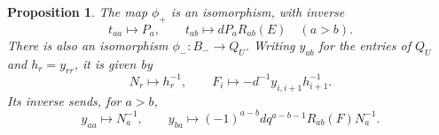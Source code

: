 \documentclass[11pt]{article}
\newtheorem{proposition}[theorem]{Proposition}
\theoremstyle{definition}
\theoremstyle{remark}
\begin{document}
\begin{proposition}\label{prop:factor-inverse}
The map $\phi_+$ is an isomorphism, with inverse
\begin{equation}\label{eq:theta-positive}
 t_{aa}\longmapsto P_a,\qquad t_{ab}\longmapsto dP_aR_{ab}(E)\quad(a>b).
\end{equation}
There is also an isomorphism $\phi_-:B_-\to Q_U$. Writing $y_{ab}$ for the entries of $Q_U$ and $h_r=y_{rr}$, it is given by
\begin{equation}\label{eq:phi-negative}
 N_r\longmapsto h_r^{-1},\qquad F_i\longmapsto-d^{-1}y_{i,i+1}h_{i+1}^{-1}.
\end{equation}
Its inverse sends, for $a>b$,
\begin{equation}\label{eq:theta-negative}
 y_{aa}\longmapsto N_a^{-1},\qquad
 y_{ba}\longmapsto(-1)^{a-b}d q^{a-b-1}R_{ab}(F)N_a^{-1}.
\end{equation}
\end{proposition}
\end{document}
